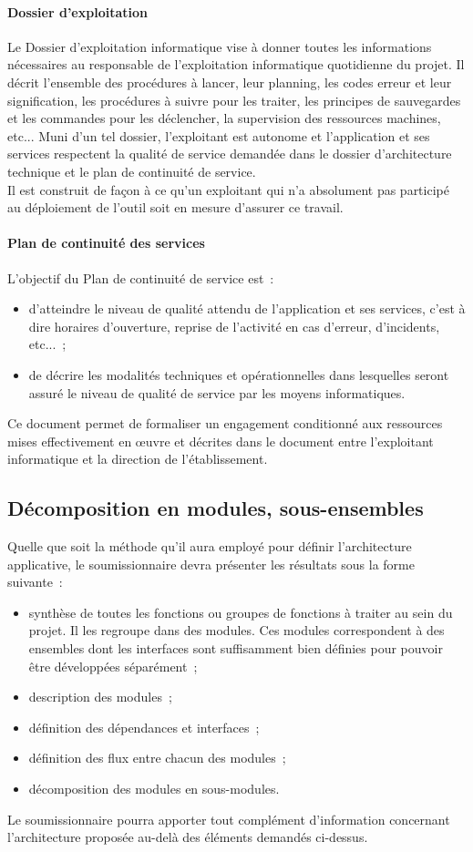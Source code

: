 \paragraph{Dossier d'exploitation}
Le Dossier d'exploitation informatique vise à donner toutes les informations nécessaires au responsable de l'exploitation informatique quotidienne du projet. Il décrit l'ensemble des procédures à lancer, leur planning, les codes erreur et leur signification, les procédures à suivre pour les traiter, les principes de sauvegardes et les commandes pour les déclencher, la supervision des ressources machines, etc... Muni d'un tel dossier, l'exploitant est autonome et l'application et ses services respectent la qualité de service demandée dans le dossier d'architecture technique et le plan de continuité de service.
\\
Il est construit de façon à ce qu'un exploitant qui n'a absolument pas participé au déploiement de l'outil soit en mesure d'assurer ce travail.

\paragraph{Plan de continuité des services}
L'objectif du Plan de continuité de service est~:
\begin{itemize}
	\item d'atteindre le niveau de qualité attendu de l'application et ses services, c'est à dire horaires d'ouverture, reprise de l'activité en cas d'erreur, d'incidents, etc...~;
	\item de décrire les modalités techniques et opérationnelles dans lesquelles seront assuré le niveau de qualité de service par les moyens informatiques.
\end{itemize}
Ce document permet de formaliser un engagement conditionné aux ressources mises effectivement en œuvre et décrites dans le document entre l'exploitant informatique et la direction de l'établissement.

\subsection{Décomposition en modules, sous-ensembles}
Quelle que soit la méthode qu'il aura employé pour définir l'architecture applicative, le soumissionnaire devra présenter les résultats sous la forme suivante~:
\begin{itemize}
	\item synthèse de toutes les fonctions ou groupes de fonctions à traiter au sein du projet. Il les regroupe dans des modules. Ces modules correspondent à des ensembles dont les interfaces sont suffisamment bien définies pour pouvoir être développées séparément~;
	\item description des modules~;
	\item définition des dépendances et interfaces~;
	\item définition des flux entre chacun des modules~;
	\item décomposition des modules en sous-modules.
\end{itemize}
Le soumissionnaire pourra apporter tout complément d'information concernant l'architecture proposée au-delà des éléments demandés ci-dessus.

